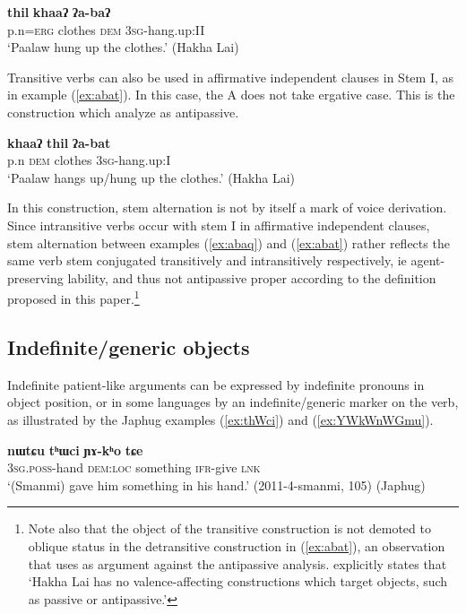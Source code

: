 \documentclass[oneside,a4paper,11pt]{article}
\newcommand{\ipa}[1]{{\phon\textbf{#1}}}
\begin{document}
\begin{exe}
\ex \label{ex:abaq}
\gll \ipa{paalaw=niʔ} \ipa{thil} \ipa{khaaʔ} \ipa{ʔa-baʔ} \\
p.n=\textsc{erg} clothes \textsc{dem} \textsc{3sg}-hang.up:II \\
\glt `Paalaw hung up the clothes.' (Hakha Lai)
\end{exe}

Transitive verbs can also be used in affirmative independent clauses in Stem I, as in example (\ref{ex:abat}). In this case, the A does not take ergative case. This is the construction which \citet{kathol01alternations} analyze as antipassive.

\begin{exe}
\ex \label{ex:abat}
\gll \ipa{paalaw} \ipa{khaaʔ}  \ipa{thil} \ipa{ʔa-bat} \\
p.n \textsc{dem} clothes \textsc{3sg}-hang.up:I \\
\glt `Paalaw hangs up/hung up the clothes.' (Hakha Lai)
\end{exe}

In this construction, stem alternation is not by itself a mark of voice derivation. Since intransitive verbs occur with stem I in affirmative independent clauses, stem alternation between examples (\ref{ex:abaq}) and (\ref{ex:abat}) rather reflects the same verb stem conjugated transitively and intransitively respectively, ie agent-preserving lability, and thus not antipassive proper according to the definition proposed in this paper.\footnote{Note also that the object of the transitive construction is not demoted to oblique status in the detransitive construction in (\ref{ex:abat}), an observation that \citet[413]{peterson03hakha} uses as argument against the antipassive analysis. \citet[37]{peterson07appl} explicitly states that `Hakha Lai has no valence-affecting constructions which target objects, such as passive or antipassive.'} 
 
\subsection{Indefinite/generic objects} \label{sec:indef}
Indefinite patient-like arguments can be expressed by indefinite pronouns in object position, or in some languages by an indefinite/generic marker on the verb, as illustrated by the Japhug examples (\ref{ex:thWci}) and (\ref{ex:YWkWnWGmu}).

\begin{exe}
\ex  \label{ex:thWci}
\gll \ipa{ɯ-jaʁ} \ipa{nɯtɕu} \ipa{tʰɯci} \ipa{ɲɤ-kʰo} \ipa{tɕe} \\
\textsc{3sg.poss}-hand \textsc{dem:loc} something \textsc{ifr}-give \textsc{lnk} \\
\glt `(Smanmi) gave him something in his hand.' (2011-4-smanmi, 105) (Japhug)
\end{exe}
\end{document}
